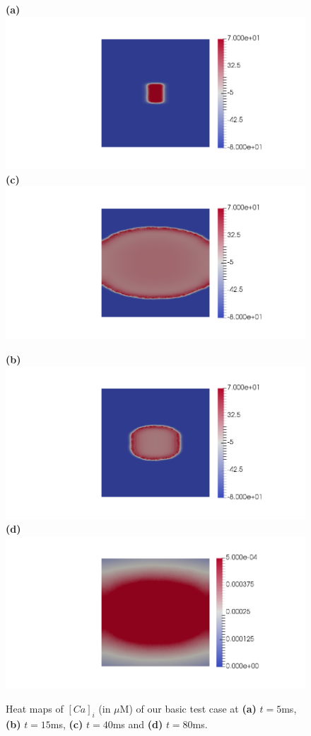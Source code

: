 \documentclass[12pt,a4paper]{article}
\begin{document}
%
\begin{figure}
\begin{minipage}{0.47\textwidth}
 \textbf{(a)} \includegraphics[trim=9cm 0cm 2cm 0cm, clip=true, width=0.9\linewidth]{v5}
      \textbf{(c)} \includegraphics[trim=9cm 0cm 2cm 0cm, clip=true, width=0.9\linewidth]{v40}
    \end{minipage}
    \begin{minipage}{0.47\textwidth}
  \textbf{(b)} \includegraphics[trim=9cm 0cm 2cm 0cm, clip=true, width=0.9\linewidth]{v15}
  \textbf{(d)} \includegraphics[trim=9cm 0cm 2cm 0cm, clip=true, width=0.9\linewidth]{Casl80}
    \end{minipage}
    \caption{Heat maps of $[Ca]_i$ (in $\mu$M) of our basic test case at \textbf{(a)} $t=5$ms, \textbf{(b)} $t=15$ms, \textbf{(c)} $t=40$ms and \textbf{(d)} $t=80$ms.}
    \label{fig:2}
\end{figure}
\end{document}
